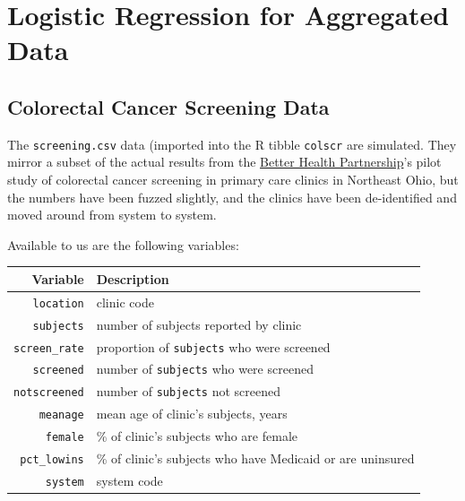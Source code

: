 \documentclass[]{book}
\newenvironment{Shaded}{\begin{snugshade}}{\end{snugshade}}
\newcommand{\KeywordTok}[1]{\textcolor[rgb]{0.13,0.29,0.53}{\textbf{#1}}}
\newcommand{\StringTok}[1]{\textcolor[rgb]{0.31,0.60,0.02}{#1}}
\newcommand{\OperatorTok}[1]{\textcolor[rgb]{0.81,0.36,0.00}{\textbf{#1}}}
\newcommand{\NormalTok}[1]{#1}
\theoremstyle{definition}
\theoremstyle{definition}
\theoremstyle{definition}
\theoremstyle{remark}
\begin{document}
\section{Logistic Regression for Aggregated
Data}\label{logistic-regression-for-aggregated-data}

\subsection{Colorectal Cancer Screening
Data}\label{colorectal-cancer-screening-data}

The \texttt{screening.csv} data (imported into the R tibble
\texttt{colscr} are simulated. They mirror a subset of the actual
results from the
\href{http://www.betterhealthpartnership.org/data_center/}{Better Health
Partnership}'s pilot study of colorectal cancer screening in primary
care clinics in Northeast Ohio, but the numbers have been fuzzed
slightly, and the clinics have been de-identified and moved around from
system to system.

Available to us are the following variables:

\begin{longtable}[]{@{}rl@{}}
\toprule
Variable & Description\tabularnewline
\midrule
\endhead
\texttt{location} & clinic code\tabularnewline
\texttt{subjects} & number of subjects reported by clinic\tabularnewline
\texttt{screen\_rate} & proportion of \texttt{subjects} who were
screened\tabularnewline
\texttt{screened} & number of \texttt{subjects} who were
screened\tabularnewline
\texttt{notscreened} & number of \texttt{subjects} not
screened\tabularnewline
\texttt{meanage} & mean age of clinic's subjects, years\tabularnewline
\texttt{female} & \% of clinic's subjects who are female\tabularnewline
\texttt{pct\_lowins} & \% of clinic's subjects who have Medicaid or are
uninsured\tabularnewline
\texttt{system} & system code\tabularnewline
\bottomrule
\end{longtable}

\begin{Shaded}
\end{Shaded}
\end{document}
